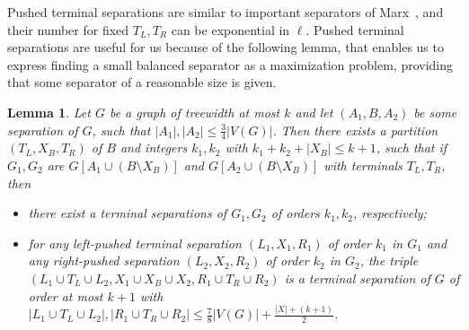 \documentclass[a4paper,11pt]{article}
\newtheorem{lemma}{Lemma}[section]
\theoremstyle{definition}
\theoremstyle{remark}
\begin{document}
Pushed terminal separations are similar to important separators of
Marx~\cite{Marx06}, and their number for fixed $T_L,T_R$ can be
exponential in $\ell$.  Pushed terminal separations are useful for us
because of the following lemma, that enables us to express finding a
small balanced separator as a maximization problem, providing that
some separator of a reasonable size is given.

\begin{lemma}\label{lem:c4vc}
  Let $G$ be a graph of treewidth at most $k$ and let $(A_1,B,A_2)$ be
  some separation of $G$, such that
  $|A_1|,|A_2|\leq \frac{3}{4}|V(G)|$.  Then there exists a partition
  $(T_L,X_B,T_R)$ of $B$ and integers $k_1,k_2$ with
  $k_1+k_2+|X_B|\leq k+1$, such that if $G_1,G_2$ are $G[A_1\cup
  (B\setminus X_B)]$ and $G[A_2\cup (B\setminus X_B)]$ with terminals
  $T_L,T_R$, then
  \begin{itemize}
  \item[(i)] there exist a terminal separations of $G_1,G_2$ of orders
    $k_1,k_2$, respectively;
  \item[(ii)] for any left-pushed terminal separation $(L_1,X_1,R_1)$
    of order $k_1$ in $G_1$ and any right-pushed separation
    $(L_2,X_2,R_2)$ of order $k_2$ in $G_2$, the triple $(L_1\cup
    T_L\cup L_2,X_1\cup X_B\cup X_2,R_1\cup T_R\cup R_2)$ is a
    terminal separation of $G$ of order at most $k+1$ with $|L_1\cup T_L\cup
    L_2|,|R_1\cup T_R\cup R_2|\leq \frac{7}{8}|V(G)|+\frac{|X|+(k+1)}{2}$.
  \end{itemize}
\end{lemma}
\end{document}
